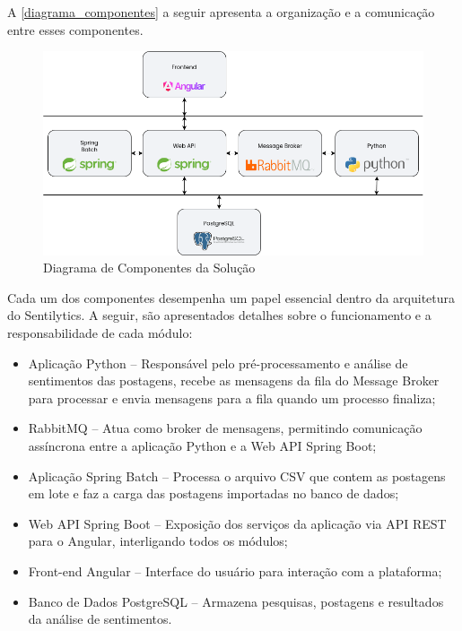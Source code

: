 \documentclass[
	12pt,				%
	oneside,			%
	a4paper,			%
	english,			%
	french,				%
	spanish,			%
	brazil				%
	]{abntex2}
\begin{document}
A \autoref{diagrama_componentes} a seguir apresenta a organização e a
comunicação entre esses componentes.

\begin{figure}[htbp]
\hypertarget{diagrama_componentes}{%
\caption{Diagrama de Componentes da Solução}\label{diagrama_componentes}
\begin{center}
\includegraphics[scale=0.4]{imagens/sentilytics/diagramas/diagrama_componentes.png}
\end{center}
}
\end{figure}

Cada um dos componentes desempenha um papel essencial dentro da
arquitetura do Sentilytics. A seguir, são apresentados detalhes sobre o
funcionamento e a responsabilidade de cada módulo:

\begin{itemize}
\tightlist
\item
  Aplicação Python -- Responsável pelo pré-processamento e análise de
  sentimentos das postagens, recebe as mensagens da fila do Message
  Broker para processar e envia mensagens para a fila quando um processo
  finaliza;
\item
  RabbitMQ -- Atua como broker de mensagens, permitindo comunicação
  assíncrona entre a aplicação Python e a Web API Spring Boot;
\item
  Aplicação Spring Batch -- Processa o arquivo CSV que contem as
  postagens em lote e faz a carga das postagens importadas no banco de
  dados;
\item
  Web API Spring Boot -- Exposição dos serviços da aplicação via API
  REST para o Angular, interligando todos os módulos;
\item
  Front-end Angular -- Interface do usuário para interação com a
  plataforma;
\item
  Banco de Dados PostgreSQL -- Armazena pesquisas, postagens e
  resultados da análise de sentimentos.
\end{itemize}
\end{document}
